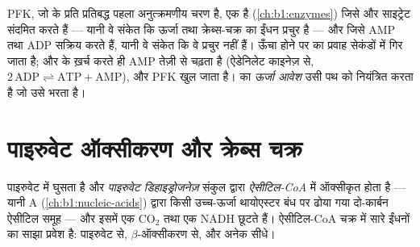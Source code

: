 \begin{proposition}[फ़ॉस्फ़ोफ्रक्टोकाइनेज़ पर नियंत्रण]\label{prop:b1:respiration-fermentation:pfk}
PFK, जो  के प्रति प्रतिबद्ध पहला अनुत्क्रमणीय चरण है, एक
 है (\cref{ch:b1:enzymes}) जिसे  और साइट्रेट
संदमित करते हैं --- यानी वे संकेत कि ऊर्जा तथा क्रेब्स-चक्र का ईंधन
प्रचुर है --- और जिसे AMP तथा ADP सक्रिय करते हैं, यानी वे संकेत कि वे
प्रचुर नहीं हैं।  ऊँचा होने पर  का प्रवाह सेकंडों में गिर
जाता है; और  के  ख़र्च करते ही AMP तेज़ी से चढ़ता है (ऐडेनिलेट
काइनेज़ से, $2\,\mathrm{ADP} \rightleftharpoons \mathrm{ATP} + \mathrm{AMP}$), और
PFK खुल जाता है।  का \emph{ऊर्जा आवेश} उसी पथ को नियंत्रित करता है
जो उसे भरता है।
\end{proposition}

\section{पाइरुवेट ऑक्सीकरण और क्रेब्स चक्र}

\begin{definition}[पाइरुवेट डिहाइड्रोजनेज़, ऐसीटिल-CoA]\label{def:b1:respiration-fermentation:pdh}
पाइरुवेट  में घुसता है और \emph{पाइरुवेट
डिहाइड्रोजनेज़} संकुल द्वारा \emph{ऐसीटिल-CoA} में
ऑक्सीकृत होता है --- यानी  A (\cref{ch:b1:nucleic-acids}) द्वारा
किसी उच्च-ऊर्जा थायोएस्टर बंध पर ढोया गया दो-कार्बन ऐसीटिल समूह --- और
इसमें एक $\mathrm{CO_2}$ तथा एक NADH छूटते हैं। ऐसीटिल-CoA चक्र में सारे
ईंधनों का साझा प्रवेश है:  पाइरुवेट से, 
$\beta$-ऑक्सीकरण से, और अनेक  सीधे।
\end{definition}

